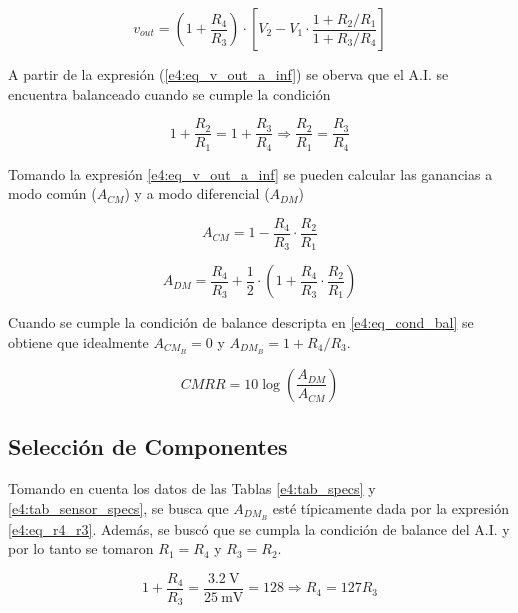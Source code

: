 \begin{equation}
v_{out} = \left(1 + \frac{R_4}{R_3}\right) \cdot \left[ V_2 - V_1 \cdot \frac{1+ R_2/R_1}{1+R_3/R_4} \right]
\label{e4:eq_v_out_a_inf}
\end{equation}

A partir de la expresión (\ref{e4:eq_v_out_a_inf}) se oberva que el A.I. se encuentra balanceado cuando se cumple la condición

\begin{equation}
1+\frac{R_2}{R_1} = 1+\frac{R_3}{R_4} \Rightarrow \frac{R_2}{R_1} = \frac{R_3}{R_4}
\label{e4:eq_cond_bal}
\end{equation}

Tomando la expresión \eqref{e4:eq_v_out_a_inf} se pueden calcular las ganancias a modo común ($A_{CM}$) y a modo diferencial ($A_{DM}$)

\begin{equation}
A_{CM} = 1 - \frac{R_4}{R_3} \cdot \frac{R_2}{R_1}
\label{e4:eq_A_cm}
\end{equation}

\begin{equation}
A_{DM} = \frac{R_4}{R_3} + \frac{1}{2} \cdot \left(1+ \frac{R_4}{R_3} \cdot \frac{R_2}{R_1}\right)
\label{e4:eq_A_dm}
\end{equation}

Cuando se cumple la condición de balance descripta en \eqref{e4:eq_cond_bal} se obtiene que idealmente $A_{CM_B} = 0$ y $A_{DM_B} = 1+R_4/R_3$.

\begin{equation}
CMRR=10\log\left(\frac{A_{DM}}{A_{CM}}\right)
\end{equation}

\subsection{Selección de Componentes}
Tomando en cuenta los datos de las Tablas \ref{e4:tab_specs} y \ref{e4:tab_sensor_specs}, se busca que $A_{DM_B}$ esté típicamente dada por la expresión \eqref{e4:eq_r4_r3}. Además, se buscó que se cumpla la condición de balance del A.I. y por lo tanto se tomaron $R_1=R_4$ y $R_3 = R_2$.

\begin{equation}
1+ \frac{R_4}{R_3}=\frac{\SI{3.2}{\volt}}{\SI{25}{\milli\volt}}= 128 \Rightarrow R_4=127 R_3
\label{e4:eq_r4_r3}
\end{equation}
 
